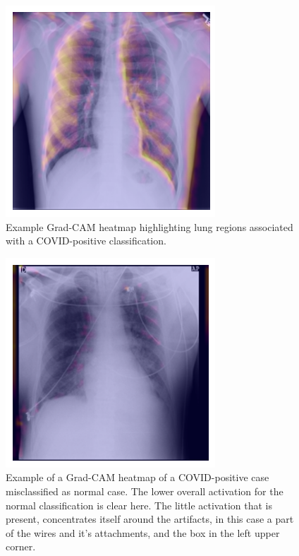\documentclass[conference]{IEEEtran}
\begin{document}
\begin{figure}[h!] \centering \includegraphics[width=0.8\columnwidth]{gradcam_example.png} \caption{Example Grad-CAM heatmap highlighting lung regions associated with a COVID-positive classification.} \label{fig:gradcam_example} \end{figure}

\begin{figure}[h!] \centering \includegraphics[width=0.8\columnwidth]{gradcam_example_misclassification.png} \caption{Example of a Grad-CAM heatmap of a COVID-positive case misclassified as normal case.  The lower overall activation for the normal classification is clear here. The little activation that is present, concentrates itself around the artifacts, in this case a part of the wires and it's attachments, and the box in the left upper corner.} \label{fig:gradcam_example_misclas} \end{figure}
\end{document}
